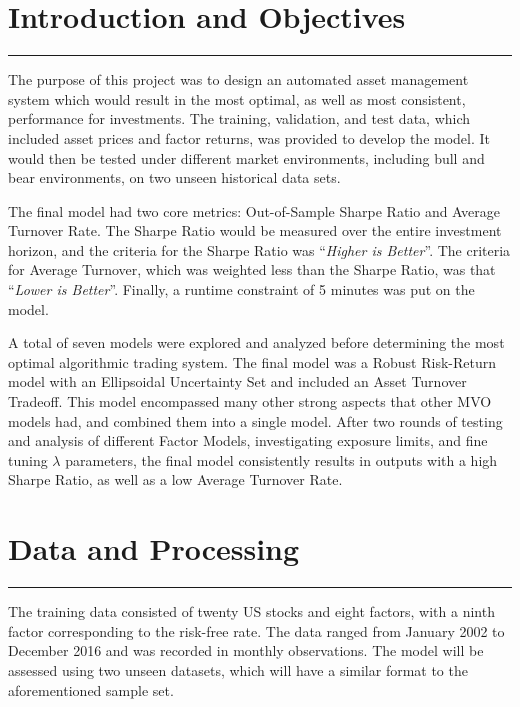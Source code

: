 \documentclass[10pt]{article}
\begin{document}
\renewcommand{\baselinestretch}{0.8}
\tableofcontents
\renewcommand{\baselinestretch}{1.5}

\newpage

\section{Introduction and Objectives}
\hrule \vspace{15pt}
The purpose of this project was to design an automated asset management system which would result in the most optimal, as well as most consistent, performance for investments. The training, validation, and test data, which included asset prices and factor returns, was provided to develop the model. It would then be tested under different market environments, including bull and bear environments, on two unseen historical data sets.\bigskip
 
The final model had two core metrics: Out-of-Sample Sharpe Ratio and Average Turnover Rate. The Sharpe Ratio would be measured over the entire investment horizon, and the criteria for the Sharpe Ratio was “\textit{Higher is Better}”. The criteria for Average Turnover, which was weighted less than the Sharpe Ratio, was that “\textit{Lower is Better}”. Finally, a runtime constraint of 5 minutes was put on the model. \bigskip

A total of seven models were explored and analyzed before determining the most optimal algorithmic trading system. The final model was a Robust Risk-Return model with an Ellipsoidal Uncertainty Set and included an Asset Turnover Tradeoff. This model encompassed many other strong aspects that other MVO models had, and combined them into a single model. After two rounds of testing and analysis of different Factor Models, investigating exposure limits, and fine tuning $\lambda$ parameters, the final model consistently results in outputs with a high Sharpe Ratio, as well as a low Average Turnover Rate.

\section{Data and Processing}
\hrule \vspace{15pt}
The training data consisted of twenty US stocks and eight factors, with a ninth factor corresponding to the risk-free rate. The data ranged from January 2002 to December 2016 and was recorded in monthly observations. The model will be assessed using two unseen datasets, which will have a similar format to the aforementioned sample set. \bigskip
\end{document}
